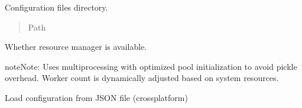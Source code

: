 \documentclass[a4paper,11pt,english,openany,oneside]{sphinxmanual}
\begin{document}

\begin{fulllineitems}
\label{\detokenize{modules/core:core.analysis.CONFIG_DIR}}
\pysigstartsignatures
\pysigline
{}
\pysigstopsignatures
\sphinxAtStartPar
Configuration files directory.
\begin{quote}\begin{description}
\sphinxAtStartPar
Path

\end{description}\end{quote}

\end{fulllineitems}


\begin{fulllineitems}
\label{\detokenize{modules/core:core.analysis.RESOURCE_MANAGER_AVAILABLE}}
\pysigstartsignatures
\pysigline
{}
\pysigstopsignatures
\sphinxAtStartPar
Whether resource manager is available.
\begin{quote}\begin{description}
\sphinxAtStartPar
{}

\end{description}\end{quote}

\end{fulllineitems}


\begin{sphinxadmonition}{note}{Note:}
\sphinxAtStartPar
Uses multiprocessing with optimized pool initialization to avoid
pickle overhead. Worker count is dynamically adjusted based on system resources.
\end{sphinxadmonition}

\begin{fulllineitems}
\label{\detokenize{modules/core:core.analysis.load_config}}
\pysigstartsignatures
\pysiglinewithargsret
{}
{}
{}
\pysigstopsignatures
\sphinxAtStartPar
Load configuration from JSON file (cross\sphinxhyphen{}platform)

\end{fulllineitems}
\end{document}
